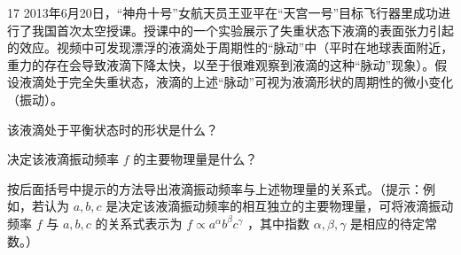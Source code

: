 \begin{problem}[第31届全国中学生物理竞赛复赛][失重液滴脉动]{17}
2013年6月20日，“神舟十号”女航天员王亚平在“天宫一号”目标飞行器里成功进行了我国首次太空授课。授课中的一个实验展示了失重状态下液滴的表面张力引起的效应。视频中可发现漂浮的液滴处于周期性的“脉动”中（平时在地球表面附近，重力的存在会导致液滴下降太快，以至于很难观察到液滴的这种“脉动”现象）。假设液滴处于完全失重状态，液滴的上述“脉动”可视为液滴形状的周期性的微小变化（振动）。
    \begin{subproblem}
        该液滴处于平衡状态时的形状是什么？
    \end{subproblem}
    \begin{subproblem}
        决定该液滴振动频率 $f$ 的主要物理量是什么？
    \end{subproblem}
    \begin{subproblem}
        按后面括号中提示的方法导出液滴振动频率与上述物理量的关系式。（提示：例如，若认为 $a, b, c$ 是决定该液滴振动频率的相互独立的主要物理量，可将液滴振动频率 $f$ 与 $a, b, c$ 的关系式表示为 $f \propto a^{\alpha} b^{\beta} c^{\gamma}$ ，其中指数 $\alpha, \beta, \gamma$ 是相应的待定常数。）
    \end{subproblem}
\end{problem}